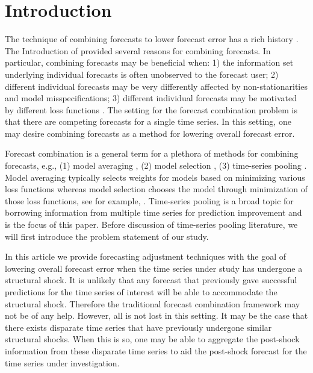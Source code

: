 \documentclass[11pt]{article}
\theoremstyle{definition}
\begin{document}
\section{Introduction}
The technique of combining forecasts to lower forecast error has a rich 
history \citep{bates1969combination, mundlak1978pooling, 
  timmermann2006forecast, granger2014forecasting}.  
The Introduction of \citet{timmermann2006forecast} provided several reasons 
for combining forecasts.  In particular, combining forecasts may be 
beneficial when: 
1) the information set underlying individual forecasts is often unobserved to 
the forecast user; 2) different individual forecasts may be very differently 
affected by non-stationarities and model misspecifications; 3) different 
individual forecasts may be motivated by different loss functions 
\citep[and references therein]{timmermann2006forecast}.
The setting for the forecast combination problem is that there are 
competing forecasts for a single time series.  In this setting, one may 
desire combining forecasts as a method for lowering overall forecast error.  


Forecast combination is a general term for a plethora of  methods for combining forecasts, e.g., (1) model averaging \citep{newbold2002forecast, timmermann2006forecast, hansen2008least}, (2) model selection \citep{lee2015model,greenaway2020multistep}, (3) time-series pooling \citep{mundlak1978pooling,zellner1991forecasting, lee2020estimation,plessen2020integrated}. Model averaging typically selects weights for models based on minimizing various loss functions whereas model selection chooses the model through minimization of those loss functions, see for example, \citet{fosten2019panel}. Time-series pooling is a broad topic for borrowing information from multiple time series for prediction improvement and is the focus of this paper. Before discussion of time-series pooling literature, we will first introduce the problem statement of our study.



In this article we provide forecasting adjustment techniques with the goal 
of lowering overall forecast error when the time series under study has 
undergone a structural shock.
It is unlikely that any forecast that previously gave successful predictions 
for the time series of interest will be able to accommodate the 
structural shock.  Therefore the traditional forecast combination framework 
may not be of any help. However, all is not lost in this setting. It may be 
the case that there exists disparate time series that have previously 
undergone similar structural shocks.  When this is so, one may be able to 
aggregate the post-shock information from these disparate time series to 
aid the post-shock forecast for the time series under investigation.  
\end{document}

